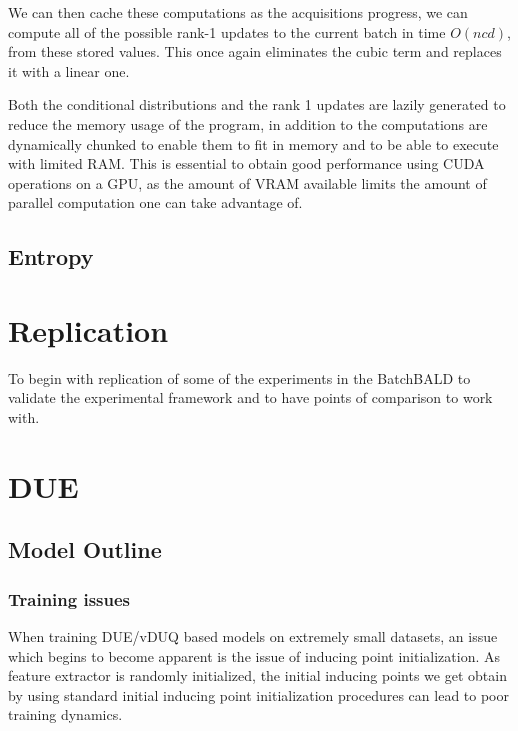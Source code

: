 \documentclass[12pt, a4paper]{report}
\theoremstyle{definition}
\theoremstyle{definition}
\theoremstyle{definition}
\begin{document}
We can then cache these computations as the acquisitions progress, we can compute all of the possible rank-1 updates to the current batch in time $O(ncd)$, from these stored values. This once again eliminates the cubic term and replaces it with a linear one.


Both the conditional distributions and the rank 1 updates are lazily generated to reduce the memory usage of the program, in addition to the computations are dynamically chunked to enable them to fit in memory and to be able to execute with limited RAM. This is essential to obtain good performance using CUDA operations on a GPU, as the amount of VRAM available limits the amount of parallel computation one can take advantage of.

\subsection{Entropy}



\section{Replication}

To begin with replication of some of the experiments in the BatchBALD to validate the experimental framework and to have points of comparison to work with.




\section{DUE}

\subsection{Model Outline}


\subsubsection{Training issues}

When training DUE/vDUQ based models on extremely small datasets, an issue which begins to become apparent is the issue of inducing point initialization. As feature extractor is randomly initialized, the initial inducing points we get obtain by using standard initial inducing point initialization procedures can lead to poor training dynamics.
\end{document}

